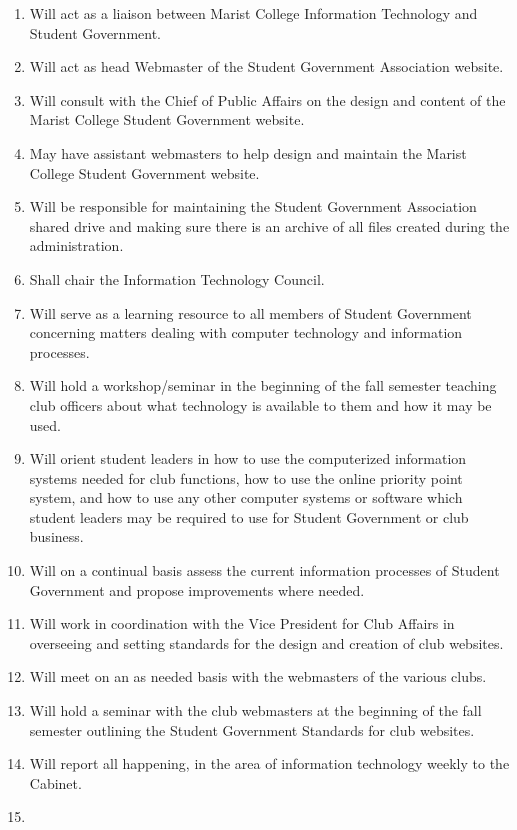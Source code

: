 \documentclass[11pt]{report}
\begin{document}
		\begin{enumerate}
			\item{Will act as a liaison between Marist College Information Technology and Student Government.}
			\item{Will act as head Webmaster of the Student Government Association website.}
			\item{Will consult with the Chief of Public Affairs on the design and content of the Marist College Student Government website.}
			\item{May have assistant webmasters to help design and maintain the Marist College Student Government website.}
			\item{Will be responsible for maintaining the Student Government Association shared drive and making sure there is an archive of all files created during the administration.}
			\item{Shall chair the Information Technology Council.}
			\item{Will serve as a learning resource to all members of Student Government concerning matters dealing with computer technology and information processes.}
			\item{Will hold a workshop/seminar in the beginning of the fall semester teaching club officers about what technology is available to them and how it may be used.}
			\item{Will orient student leaders in how to use the computerized information systems needed for club functions, how to use the online priority point system, and how to use any other computer systems or software which student leaders may be required to use for Student Government or club business.}
			\item{Will on a continual basis assess the current information processes of Student Government and propose improvements where needed.}
			\item{Will work in coordination with the Vice President for Club Affairs in overseeing and setting standards for the design and creation of club websites.}
			\item{Will meet on an as needed basis with the webmasters of the various clubs.}
			\item{Will hold a seminar with the club webmasters at the beginning of the fall semester outlining the Student Government Standards for club websites.}
			\item{Will report all happening, in the area of information technology weekly to the Cabinet.}
			\item{
}
\end{enumerate}
\end{document}
